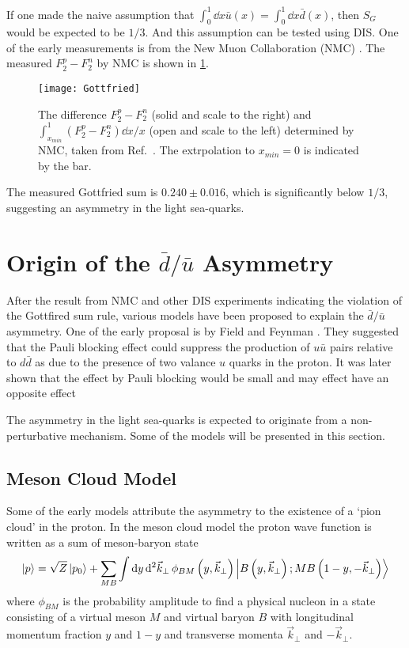 \documentclass[../main.tex]{subfiles}
\begin{document}
If one made the naive assumption that $\int_0^1\dd{x} \bar{u}\left(x\right)=\int_0^1\dd{x} \bar{d}\left(x\right)$,
then $S_G$ would be expected to be $1/3$. And this assumption can be tested using DIS.
One of the early measurements is from the New Muon Collaboration (NMC) \cite{amaudruz1991}.
The measured $F_2^p-F_2^n$ by NMC is shown in \cref{fig:NMC_Gottfried}.
\begin{figure}[htbp!]
	\centering
	\texttt{[image: Gottfried]}
	\caption{The difference $F_2^p -F_2^n$ (solid and scale to the right) and
		$\int_{x_{min}}^1 (F_2^p-F_2^n)\dd{x}/x$ (open and scale to the left)
		determined by NMC, taken from Ref.~\cite{amaudruz1991}. The extrpolation
		to $x_{min}=0$ is indicated by the bar.}
	\label{fig:NMC_Gottfried}
\end{figure}
The measured Gottfried sum is $0.240 \pm 0.016$, which is significantly below
$1/3$, suggesting an asymmetry in the light sea-quarks.

\section{Origin of the \texorpdfstring{$\bar{d}/\bar{u}$}{dbar/ubar} Asymmetry }
After the result from NMC and other DIS experiments indicating the violation of the Gottfired sum rule,
various models have been proposed to explain the $\bar{d}/\bar{u}$ asymmetry. One of the early proposal
is by Field and Feynman . They suggested that the Pauli blocking effect
could suppress the production of $u\bar{u}$ pairs relative to  $d\bar{d}$ as due to the presence of two
valance $u$ quarks in the proton. It was later shown that the effect by Pauli blocking would be small and
may effect have an opposite effect 

The asymmetry in the light sea-quarks is expected to originate from a non-perturbative mechanism. Some of
the models will be presented in this section.

\subsection{Meson Cloud Model}
Some of the early models attribute the asymmetry to the existence of a `pion cloud' in the proton.
In the meson cloud model the proton wave function is written as a sum of meson-baryon state
\begin{equation}
	\ket{p} = \sqrt{Z}\ket{p_0} + \sum_{MB}\int \dd{y} \dd[2]{\vec{k}_\perp} \phi_{BM} \left(y, \vec{k}_\perp\right)\ket{B\left(y, \vec{k}_\perp\right);MB\left(1-y, -\vec{k}_\perp\right)}
\end{equation}
where $\phi_{BM}$ is the probability amplitude to find a physical nucleon in a state consisting of a virtual
meson $M$ and virtual baryon $B$ with longitudinal momentum fraction $y$ and $1-y$ and transverse momenta
$\vec{k}_\perp$ and $-\vec{k}_\perp$.
\end{document}
